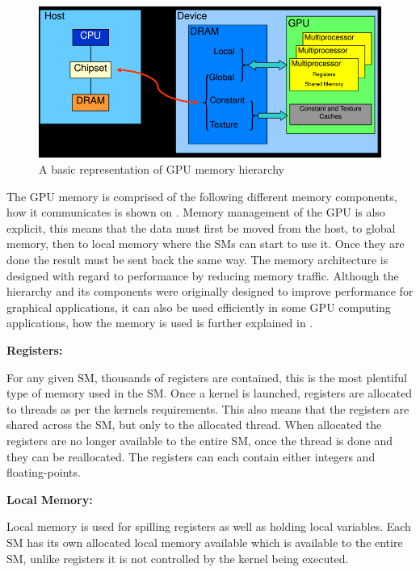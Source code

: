 \begin{figure}[h!]
\centering
 \includegraphics[width=1\textwidth]{figures/GPUMemoryClear.png} %
\caption{A basic representation of GPU memory hierarchy}\label{image:GPUMemory} 
\end{figure}
The GPU memory is comprised of the following different memory components, how it communicates is shown on . 
Memory management of the GPU is also explicit, this means that the data must first be moved from the host, to global memory, then to local memory where the SMs can start to use it. 
Once they are done the result must be sent back the same way.
The memory architecture is designed with regard to performance by reducing memory traffic.
Although the hierarchy and its components were originally designed to improve performance for graphical applications, it can also be used efficiently in some GPU computing applications, how the memory is used is further explained in . %

\textbf{Registers:}

For any given SM, thousands of registers are contained, this is the most plentiful type of memory used in the SM. 
Once a kernel is launched, registers are allocated to threads as per the kernels requirements.
This also means that the registers are shared across the SM, but only to the allocated thread.
When allocated the registers are no longer available to the entire SM, once the thread is done and they can be reallocated.
The registers can each contain either integers and floating-points.

\textbf{Local Memory:}

Local memory is used for spilling registers as well as holding local variables.
Each SM has its own allocated local memory available which is available to the entire SM, unlike registers it is not controlled by the kernel being executed.

